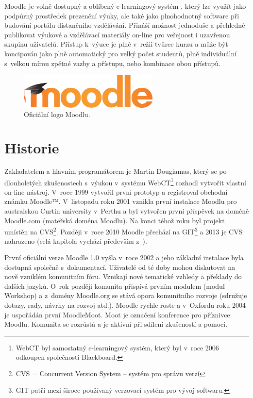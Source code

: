 \documentclass[
print,
  11pt,
  table,   
  nolof,    
  nolot,
  oneside,final
]{fithesis3}
\begin{document}
Moodle je volně dostupný a oblíbený e-learningový systém \cite{capterra}, který lze využít jako podpůrný prostředek prezenční výuky, ale také jako plnohodnotný software při budování portálu distančního vzdělávání. Přináší možnost jednoduše a přehledně publikovat výukové a vzdělávací materiály on-line pro veřejnost i uzavřenou skupinu uživatelů.  Přístup k~výuce je plně v~režii tvůrce kurzu a může být koncipován jako plně automatický pro velký počet studentů, plně individuální s~velkou mírou zpětné vazby a přístupu, nebo kombinace obou přístupů.
\begin{figure}
		  \begin{center}
		    \includegraphics[width=70mm]{images/moodle-logo.png}
		   \end{center}
		  \caption{Oficiální logo Moodlu. \cite{moodle-logo}}
		  \label{fig:moodlelogo}
		\end{figure}
	\section{Historie}
Zakladatelem a hlavním programátorem je Martin Dougiamas, který se po dlouholetých zkušenostech s~výukou v~systému WebCT\footnote{WebCT byl samostatný e-learningový systém, který byl v~roce 2006 odkoupen společností Blackboard.}  rozhodl vytvořit vlastní on-line nástroj. V~roce 1999 vytvořil první prototyp a registroval obchodní známku Moodle™. V~listopadu roku 2001 vznikla první instalace Moodlu pro australskou Curtin university v~Perthu a byl vytvořen první příspěvek na doméně Moodle.com (mateřská doména Moodlu).  Na konci téhož roku byl projekt umístěn na CVS\footnote{CVS = Concurrent Version System -- systém pro správu verzí}. Později v~roce 2010 Moodle přechází na GIT\footnote{GIT patří mezi široce používaný verzovací systém pro vývoj softwaru.}  a 2013 je CVS nahrazeno (celá kapitola vychází především z~\cite{history}).

První oficiální verze Moodle 1.0 vyšla v~roce 2002 a jeho základní instalace byla dostupná společně s~dokumentací. Uživatelé od té doby mohou diskutovat na nově vzniklém komunitním fóru. Vznikají nové tematické vzhledy a překlady do dalších jazyků. O~rok později komunita přispívá prvním modulem (modul Workshop) a z~domény Moodle.org se stává opora komunitního rozvoje (sdružuje dotazy, rady, návrhy na rozvoj atd.). Moodle rychle roste a v~Oxfordu roku 2004 je uspořádán první MoodleMoot. Moot je označení konference pro příznivce Moodlu. Komunita se rozrůstá a je aktivní při sdílení zkušeností a pomoci.
\end{document}
